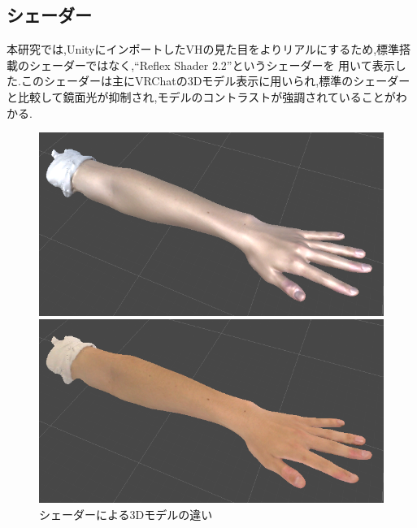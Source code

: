 \documentclass{ltjsreport}
\begin{document}
		\subsection{シェーダー}
			本研究では,UnityにインポートしたVHの見た目をよりリアルにするため,標準搭載のシェーダーではなく,``Reflex Shader 2.2''というシェーダーを
			用いて表示した.このシェーダーは主にVRChatの3Dモデル表示に用いられ,標準のシェーダーと比較して鏡面光が抑制され,モデルのコントラストが強調されていることがわかる.
			\begin{figure}[H]
			\centering
			\begin{minipage}{0.4\columnwidth}
			\centering
			\includegraphics[width = \columnwidth]{../figs/NomalShader.png}
			\end{minipage}
			\hspace{0.04\columnwidth}
			\begin{minipage}{0.4\columnwidth}
			\centering
			\includegraphics[width = \columnwidth]{../figs/ReflexShader.png}
			\end{minipage}
			\caption{シェーダーによる3Dモデルの違い}
			\label{fig:Shader}
			\end{figure}
\vspace{-15pt}
\end{document}
